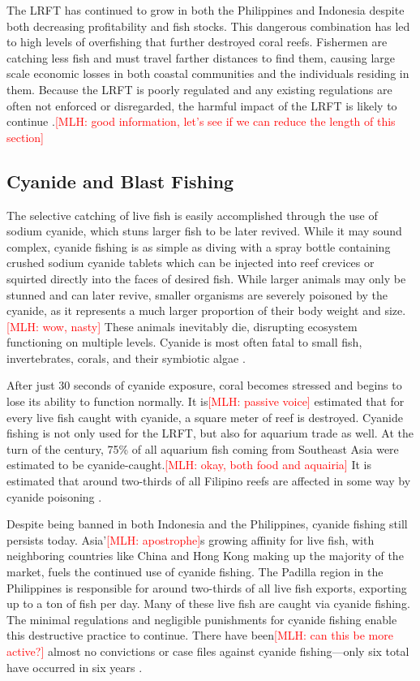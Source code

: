 \documentclass{book}\usepackage{knitr}
\newcommand{\red}[1]{\textcolor{red}{[MLH: #1]}}
\begin{document}
{The LRFT has continued to grow in both the Philippines and Indonesia despite both decreasing profitability and fish stocks. This dangerous combination has led to high levels of overfishing that further destroyed coral reefs. Fishermen are catching less fish and must travel farther distances to find them, causing large scale economic losses in both coastal communities and the individuals residing in them. Because the LRFT is poorly regulated and any existing regulations are often not enforced or disregarded, the harmful impact of the LRFT is likely to continue \citep{10.2307/40603032}.\red{good information, let's see if we can reduce the length of this section}

\subsection{Cyanide and Blast Fishing}

The selective catching of live fish is easily accomplished through the use of sodium cyanide, which stuns larger fish to be later revived. While it may sound complex, cyanide fishing is as simple as diving with a spray bottle containing crushed sodium cyanide tablets which can be injected into reef crevices or squirted directly into the faces of desired fish. While larger animals may only be stunned and can later revive, smaller organisms are severely poisoned by the cyanide, as it represents a much larger proportion of their body weight and size.\red{wow, nasty} These animals inevitably die, disrupting ecosystem functioning on multiple levels. Cyanide is most often fatal to small fish, invertebrates, corals, and their symbiotic algae \citep{wwfcyanide}.

	After just 30 seconds of cyanide exposure, coral becomes stressed and begins to lose its ability to function normally. It is\red{passive voice} estimated that for every live fish caught with cyanide, a square meter of reef is destroyed. Cyanide fishing is not only used for the LRFT, but also for aquarium trade as well. At the turn of the century, 75\% of all aquarium fish coming from Southeast Asia were estimated to be cyanide-caught.\red{okay, both food and aquairia} It is estimated that around two-thirds of all Filipino reefs are affected in some way by cyanide poisoning \citep{970313024119970301}.

Despite being banned in both Indonesia and the Philippines, cyanide fishing still persists today. Asia’\red{apostrophe}s growing affinity for live fish, with neighboring countries like China and Hong Kong making up the majority of the market, fuels the continued use of cyanide fishing. The Padilla region in the Philippines is responsible for around two-thirds of all live fish exports, exporting up to a ton of fish per day. Many of these live fish are caught via cyanide fishing. The minimal regulations and negligible punishments for cyanide fishing enable this destructive practice to continue. There have been\red{can this be more active?} almost no convictions or case files against cyanide fishing—only six total have occurred in six years \citep{wwfcyanide}.

}
\end{document}
